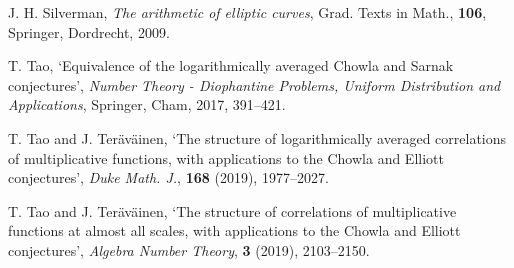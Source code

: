 \documentclass[12pt]{amsart}
\begin{document}
\begin{thebibliography}{9}
J. H. Silverman, {\it The arithmetic of elliptic curves\/}, Grad. Texts in Math., {\bf 106}, Springer, Dordrecht, 2009.

T. Tao, `Equivalence of the logarithmically averaged Chowla and Sarnak conjectures', 
{\it Number Theory - Diophantine Problems, Uniform Distribution and
Applications\/},  Springer, Cham, 2017, 391--421.

T. Tao and J. Ter{\"a}v{\"a}inen, `The structure of logarithmically averaged correlations of multiplicative functions, 
with applications to the Chowla and Elliott conjectures',
{\it Duke Math. J.\/}, {\bf 168} (2019), 1977--2027.

T. Tao and J. Ter{\"a}v{\"a}inen, `The structure of correlations of multiplicative functions at almost all scales,  with applications to the Chowla and Elliott conjectures', 
{\it Algebra Number Theory\/}, {\bf 3} (2019), 2103--2150. 

\end{thebibliography}
\end{document}
